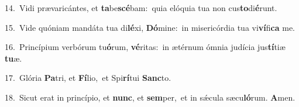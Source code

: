 {\numbfont\textcolor{\numbcolor}{14.}}~Vidi prævaricántes, et \textbf{ta}\-be\-\textbf{scé}\-bam:~\star quia elóquia tua non cus\-\textbf{to}\-di\-\textbf{é}\-runt.\par
{\numbfont\textcolor{\numbcolor}{15.}}~Vide quóniam mandáta tua di\-\textbf{lé}\-xi, \textbf{Dó}\-mine:~\star in misericórdia tua vi\-\textbf{ví}\-fi\textbf{ca} me.\par
{\numbfont\textcolor{\numbcolor}{16.}}~Princípium verbórum tu\-\textbf{ó}\-rum, \textbf{vé}\-ritas:~\star in ætérnum ómnia judícia jus\-\textbf{tí}\-tiæ \textbf{tu}\-æ.\par
{\numbfont\textcolor{\numbcolor}{17.}}~Glória \textbf{Pa}\-tri, et \textbf{Fí}\-lio,~\star et Spi\-\textbf{rí}\-tui \textbf{Sanc}\-to.\par
{\numbfont\textcolor{\numbcolor}{18.}}~Sicut erat in princípio, et \textbf{nunc}\-, et \textbf{sem}\-per,~\star et in sǽcula sæcu\-\textbf{ló}\-rum. \textbf{A}\-men.\par
